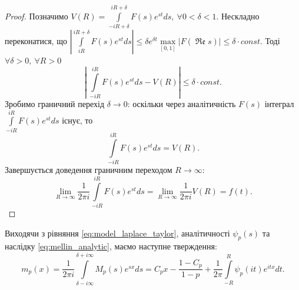 \begin{corollary}
\begin{proof}
Позначимо $V(R)=\int\limits_{-iR + \delta}^{iR + \delta} F(s) e^{st} ds, ~\forall 0 < \delta < 1$. Нескладно переконатися, що 
$|\int\limits_{iR}^{iR + \delta} F(s) e^{st} ds| \leq \delta e^{\delta t} \max\limits_{[0,1]} |F(\operatorname{\mathfrak{Re}} s)| \leq \delta \cdot const$. Тоді $\forall \delta > 0, ~\forall R > 0$
\begin{equation*}
\left|~\int\limits_{-iR}^{iR} F(s) e^{st} ds - V(R)\right| \leq \delta \cdot const.
\end{equation*}
Зробимо граничний перехід $\delta \rightarrow 0$: оскільки через аналітичність $F(s)$ інтеграл $\int\limits_{-iR}^{iR} F(s) e^{st} ds$ існує, то
\begin{equation*}
\int\limits_{-iR}^{iR} F(s) e^{st} ds = V(R).
\end{equation*}
Завершується доведення граничним переходом $R \rightarrow \infty$:
\begin{equation*}
\lim\limits_{R \rightarrow \infty} \frac{1}{2\pi i} \int\limits_{-iR}^{iR} F(s) e^{st} ds =\lim\limits_{R \rightarrow \infty}\frac{1}{2\pi i} V(R) = f(t).
\end{equation*}
\end{proof}
\end{corollary}

Виходячи з рівняння \eqref{eq:model_laplace_taylor}, аналітичності $\psi_{p} (s)$ та наслідку \eqref{eq:mellin_analytic}, маємо наступне тверждення:
\begin{equation}
m_{p}(x) = \frac{1}{2\pi i} \int\limits_{\delta - i\infty}^{\delta + i\infty} M_{p}(s) e^{sx} ds = C_{p} x - \frac{1 - C_p}{1-p} + \frac{1}{2\pi} \int\limits_{-R}^{R} \psi_{p}(it) e^{itx} dt.
\end{equation}

